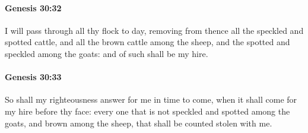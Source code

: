 		\paragraph{Genesis 30:32} %
			\label{GENESIS-30-32}

			I will pass through all thy flock to day, removing from thence all the speckled and spotted cattle, and all the brown cattle among the sheep, and the spotted and speckled among the goats: and of such shall be my hire.


		\paragraph{Genesis 30:33} %
			\label{GENESIS-30-33}

			So shall my righteousness answer for me in time to come, when it shall come for my hire before thy face: every one that is not speckled and spotted among the goats, and brown among the sheep, that shall be counted stolen with me.

